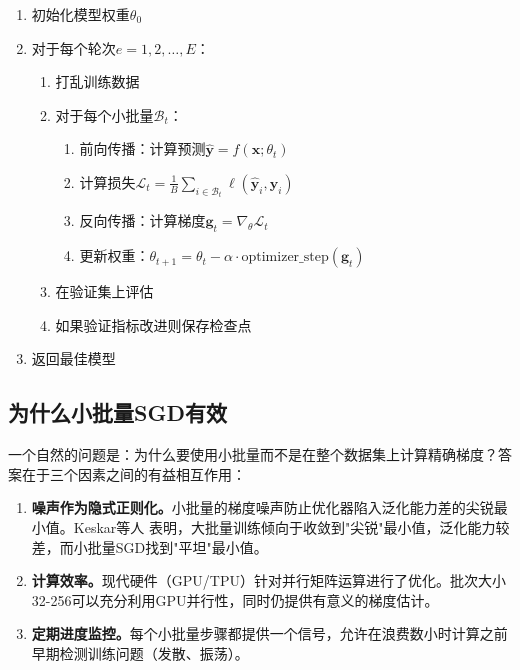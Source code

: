 \begin{algorithm}[H]
\caption{训练循环}
\begin{enumerate}
    \item 初始化模型权重$\theta_0$
    \item 对于每个轮次$e = 1, 2, \ldots, E$：
    \begin{enumerate}
        \item 打乱训练数据
        \item 对于每个小批量$\mathcal{B}_t$：
        \begin{enumerate}
            \item 前向传播：计算预测$\hat{\mathbf{y}} = f(\mathbf{x}; \theta_t)$
            \item 计算损失$\mathcal{L}_t = \frac{1}{B}\sum_{i \in \mathcal{B}_t} \ell(\hat{\mathbf{y}}_i, \mathbf{y}_i)$
            \item 反向传播：计算梯度$\mathbf{g}_t = \nabla_\theta \mathcal{L}_t$
            \item 更新权重：$\theta_{t+1} = \theta_t - \alpha \cdot \text{optimizer\_step}(\mathbf{g}_t)$
        \end{enumerate}
        \item 在验证集上评估
        \item 如果验证指标改进则保存检查点
    \end{enumerate}
    \item 返回最佳模型
\end{enumerate}
\end{algorithm}

\subsection{为什么小批量SGD有效}

一个自然的问题是：为什么要使用小批量而不是在整个数据集上计算精确梯度？答案在于三个因素之间的有益相互作用：

\begin{enumerate}
    \item \textbf{噪声作为隐式正则化。}小批量的梯度噪声防止优化器陷入泛化能力差的尖锐最小值。Keskar等人 \cite{keskar2017largebatch}表明，大批量训练倾向于收敛到"尖锐"最小值，泛化能力较差，而小批量SGD找到"平坦"最小值。
    
    \item \textbf{计算效率。}现代硬件（GPU/TPU）针对并行矩阵运算进行了优化。批次大小32-256可以充分利用GPU并行性，同时仍提供有意义的梯度估计。
    
    \item \textbf{定期进度监控。}每个小批量步骤都提供一个信号，允许在浪费数小时计算之前早期检测训练问题（发散、振荡）。
\end{enumerate}


